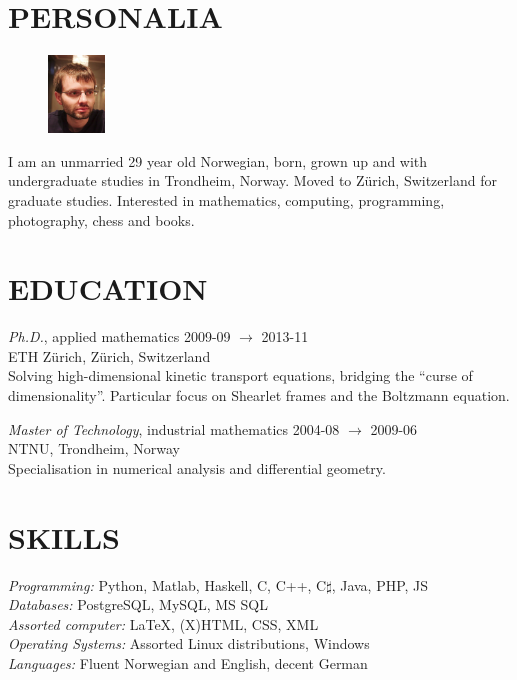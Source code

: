 \documentclass[line,margin]{res}
\newcommand{\zh}{Z\"{u}rich}
\begin{document}
\address{Forchstrasse 168, CH-8032 \zh}
\address{+41 78 634 68 37, evfonn@gmail.com}


\begin{resume}

\section{PERSONALIA}
    \begin{figure}
        \vspace{-0.6cm}
        \includegraphics[width=1.5cm]{photo.png}
    \end{figure}
    I am an unmarried 29 year old Norwegian, born, grown up and with undergraduate studies in Trondheim,
    Norway. Moved to Z\"urich, Switzerland for graduate studies. Interested in mathematics, computing,
    programming, photography, chess and books. 


\section{EDUCATION} 
    {\em Ph.D.}, applied mathematics \hfill 2009-09 $\to$ 2013-11 \\
    ETH \zh, \zh, Switzerland \\
    Solving high-dimensional kinetic transport equations, bridging the ``curse
    of dimensionality''. Particular focus on Shearlet frames and the Boltzmann
    equation.

    {\em Master of Technology}, industrial mathematics \hfill 2004-08 $\to$ 2009-06 \\
    NTNU, Trondheim, Norway \\
    Specialisation in numerical analysis and differential geometry.


\section{SKILLS}
    {\em Programming:} Python, Matlab, Haskell, C, C++, C$\sharp$, Java, PHP, JS \\
    {\em Databases:} PostgreSQL, MySQL, MS SQL \\
    {\em Assorted computer:} \LaTeX, (X)HTML, CSS, XML \\
    {\em Operating Systems:} Assorted Linux distributions, Windows \\
    {\em Languages:} Fluent Norwegian and English, decent German



\end{resume}
\end{document}
